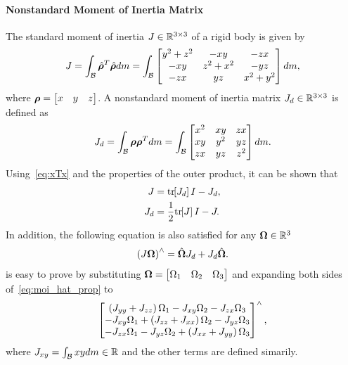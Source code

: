 \paragraph{Nonstandard Moment of Inertia Matrix}
The standard moment of inertia \( J \in \mathbb{R}^{3 \times 3} \) of a rigid body is given by
\begin{align}\label{eq:standard_moment_of_inertia}
    J = \int_{\mathcal{B}} \hat{\bm{\rho}}^T \hat{\bm{\rho}} dm 
    = \int_{\mathcal{B}}  
    \begin{bmatrix} 
        y^2 + z^2 & -xy & -zx \\
        -xy & z^2 + x^2 & -yz \\
        -zx & yz & x^2 + y^2
    \end{bmatrix} dm, 
\end{align}
where \( \bm{\rho} = \begin{bmatrix} x & y & z \end{bmatrix}\).
A nonstandard moment of inertia matrix \( J_d \in \mathbb{R}^{3 \times 3 } \) is defined as
\begin{align} \label{eq:nonstandard_moment_of_inertia}
    J_d = \int_{\mathcal{B}} \bm{\rho} \bm{\rho}^T dm = \int_{\mathcal{B}} 
    \begin{bmatrix}
        x^2 & xy & zx \\
        xy & y^2 & yz \\
        zx & yz & z^2
    \end{bmatrix} dm.
\end{align}
Using~\cref{eq:xTx} and the properties of the outer product, it can be shown that
\begin{subequations}\label{eq:moi_transformation}
    \begin{align}
        J &= \mathrm{tr}\negthickspace\left[ J_d \right] I - J_d, \\
        J_d &= \frac{1}{2} \mathrm{tr}\negthickspace\left[ J \right] I - J.
    \end{align}
\end{subequations}     
In addition, the following equation is also satisfied for any \( \bm{\Omega} \in \mathbb{R}^3 \)
\begin{align}\label{eq:moi_hat_prop}
    \left( J \bm{\Omega} \right)^\wedge = \hat{\bm{\Omega}} J_d + J_d \hat{\bm{\Omega}}.
\end{align}
 is easy to prove by substituting \( \bm{\Omega} = \begin{bmatrix} \Omega_1 & \Omega_2 & \Omega_3 \end{bmatrix} \) and expanding both sides of~\cref{eq:moi_hat_prop} to
\begin{align*}
    \begin{bmatrix}
        \left( J_{yy} + J_{zz} \right) \Omega_1 - J_{xy} \Omega_2 - J_{zx} \Omega_3 \\
        -J_{xy}\Omega_1 + \left( J_{zz} + J_{xx} \right) \Omega_2 - J_{yz}\Omega_3 \\
        -J_{zx}\Omega_1 - J_{yz}\Omega_2 + \left( J_{xx} + J_{yy} \right) \Omega_3
    \end{bmatrix}^\wedge,
\end{align*}
where \( J_{xy} = \int_{\mathcal{B}} xy dm \in \mathbb{R} \) and the other terms are defined simarily.

